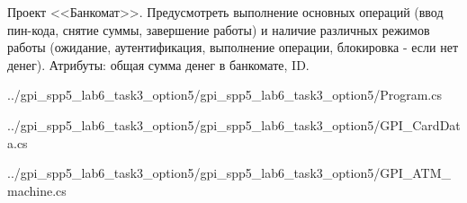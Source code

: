 Проект <<Банкомат>>. Предусмотреть выполнение основных операций
(ввод пин-кода, снятие суммы, завершение работы)
и наличие различных режимов работы
(ожидание, аутентификация, выполнение операции, блокировка - если нет денег).
Атрибуты: общая сумма денег в банкомате, ID.


{../gpi_spp5_lab6_task3_option5/gpi_spp5_lab6_task3_option5/Program.cs}


{../gpi_spp5_lab6_task3_option5/gpi_spp5_lab6_task3_option5/GPI_CardData.cs}

\newpage


{../gpi_spp5_lab6_task3_option5/gpi_spp5_lab6_task3_option5/GPI_ATM_machine.cs}
